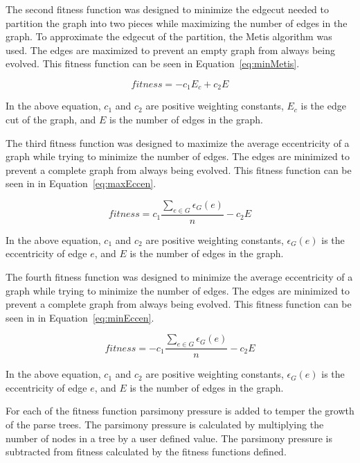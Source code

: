 \documentclass{article}
\begin{document}
The second fitness function was designed to minimize 
the edgecut needed to partition the graph into two pieces while maximizing the number of edges in the graph. To approximate the edgecut of the partition,
the Metis algorithm was used. The edges are maximized to prevent an empty graph from always being evolved. This fitness function can be seen in Equation~\ref{eq:minMetis}.

\begin{equation}
\label{eq:minMetis}
fitness = -c_1E_c + c_2E
\end{equation}

In the above equation, $c_1$ and $c_2$ are positive weighting constants, $E_c$ is the edge cut of the graph, and $E$ is the number of edges in the graph.



The third fitness function was designed to maximize the average eccentricity of a graph while trying to minimize the number of edges. The edges are minimized
to prevent a complete graph from always being evolved. This fitness function can be seen in in Equation~\ref{eq:maxEccen}.


\begin{equation}
\label{eq:maxEccen}
fitness = c_1\frac{\sum\limits_{e \in G}\epsilon_{G}(e)}{n} - c_2E
\end{equation}

In the above equation, $c_1$ and $c_2$ are positive weighting constants, $\epsilon_{G}(e)$ is the eccentricity of edge $e$, and $E$ is the number of edges in the graph.


The fourth fitness function was designed to minimize the average eccentricity of a graph while trying to minimize the number of edges. The edges are minimized to 
prevent a complete graph from always being evolved. This fitness function
can be seen in in Equation~\ref{eq:minEccen}.


\begin{equation}
\label{eq:minEccen}
fitness = -c_1\frac{\sum\limits_{e \in G}\epsilon_{G}(e)}{n} - c_2E
\end{equation}

In the above equation, $c_1$ and $c_2$ are positive weighting constants, $\epsilon_{G}(e)$ is the eccentricity of edge $e$, and $E$ is the number of edges in the graph.

For each of the fitness function parsimony pressure is added to temper the growth of the parse trees. The parsimony pressure is calculated by multiplying the number
of nodes in a tree by a user defined value. The parsimony pressure is subtracted from fitness calculated by the fitness functions defined.
\end{document}
